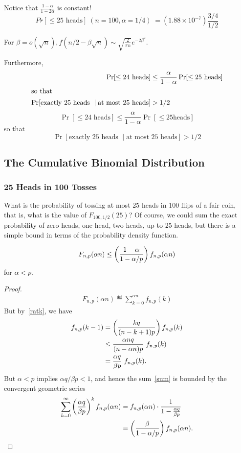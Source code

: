 \documentclass[11pt,twoside]{article}
\begin{document}
Notice that $\frac{1 -\alpha}{1 -2\alpha}$ is constant!
$$ Pr[\leq 25\mbox{ heads}] \; (n=100, \alpha=1/4) \; = (1.88\times
10^{-7})\frac{3/4}{1/2}  $$

For $\beta = o(\sqrt{n}), f(n/2-\beta\sqrt{n}) \sim \sqrt{\frac{2}{\pi
    n}}e^{-2\beta^2}$.

Furthermore,
\begin{align*}
\Pr[\le 24\mbox{ heads}] &\le \frac{\alpha}{1 -\alpha}\Pr[\le 25\mbox{
 heads}]\\
\intertext{so that}
\Pr[\mbox{exactly $25$ heads } \mid \mbox{at most $25$ heads}] &> 1/2
\end{align*}
\[
\Pr[\le 24\mbox{ heads}] \le \frac{\alpha}{1 -\alpha}\Pr[\le 25\mbox{
  heads}]
\]
so that
\[
\Pr[\mbox{exactly $25$ heads } \mid \mbox{at most $25$ heads}] > 1/2
\]
\fi

\subsection{The Cumulative Binomial Distribution}

\subsubsection{25 Heads in 100 Tosses}\label{25H}

What is the probability of tossing at most 25 heads in 100 flips of a fair
coin, that is, what is the value of $F_{100,1/2}(25)$?  Of course, we could
sum the exact probability of zero heads, one head, two heads, up to 25
heads, but there is a simple bound in terms of the probability density
function.

\begin{lemma*}
\begin{equation}\label{Fbyf}
F_{n, p}(\alpha n) \leq
\left(\frac{1 - \alpha}{1 - \alpha/p}\right) f_{n, p}(\alpha n)
\end{equation}
for $\alpha < p$.
\end{lemma*}

\begin{proof}
\begin{align}
F_{n, p}(\alpha n) \eqdef \sum_{k=0}^{\alpha n} f_{n,p}(k)\label{sum}
\end{align}
But by~\eqref{ratk}, we have
\begin{align*}
f_{n,p}(k-1) & = \left(\frac{kq}{(n-k+1)p}\right)f_{n,p}(k)\\
             & \le \frac{\alpha nq}{(n-\alpha n) p}\ f_{n,p}(k)\\
             & = \frac{\alpha q}{\beta  p}\ f_{n,p}(k).
\end{align*}
But $\alpha < p$ implies $\alpha q/\beta p < 1$, and hence the
sum~\eqref{sum} is bounded by the convergent geometric series
\begin{align*}
\sum_{k=0}^{\infty} \left(\frac{\alpha q}{\beta  p}\right)^k
f_{n,p}(\alpha n) & = f_{n,p}(\alpha n) \cdot \frac{1}{1 -\frac{\alpha q}{\beta p}}\\
& = \left(\frac{\beta}{1- \alpha/p}\right)f_{n,p}(\alpha n).
\end{align*}

\end{proof}
\end{document}
